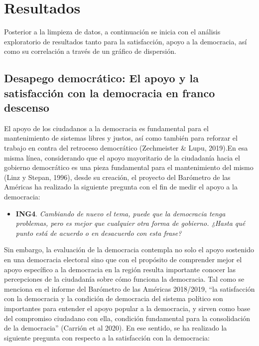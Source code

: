\documentclass[
]{book}
\providecommand{\tightlist}{%
  \setlength{\itemsep}{0pt}\setlength{\parskip}{0pt}}
\begin{document}
\hypertarget{resultados-3}{%
\section{Resultados}\label{resultados-3}}

Posterior a la limpieza de datos, a continuación se inicia con el análisis exploratorio de resultados tanto para la satisfacción, apoyo a la democracia, así como su correlación a través de un gráfico de dispersión.

\hypertarget{desapego-democruxe1tico-el-apoyo-y-la-satisfacciuxf3n-con-la-democracia-en-franco-descenso}{%
\subsection{Desapego democrático: El apoyo y la satisfacción con la democracia en franco descenso}\label{desapego-democruxe1tico-el-apoyo-y-la-satisfacciuxf3n-con-la-democracia-en-franco-descenso}}

El apoyo de los ciudadanos a la democracia es fundamental para el mantenimiento de sistemas libres y justos, así como también para reforzar el trabajo en contra del retroceso democrático (Zechmeister \& Lupu, 2019).En esa misma línea, considerando que el apoyo mayoritario de la ciudadanía hacia el gobierno democrático es una pieza fundamental para el mantenimiento del mismo (Linz y Stepan, 1996), desde su creación, el proyecto del Barómetro de las Américas ha realizado la siguiente pregunta con el fin de medir el apoyo a la democracia:

\begin{itemize}
\tightlist
\item
  \textbf{ING4}. \emph{Cambiando de nuevo el tema, puede que la democracia tenga problemas, pero es mejor que cualquier otra forma de gobierno. ¿Hasta qué punto está de acuerdo o en desacuerdo con esta frase?}
\end{itemize}

Sin embargo, la evaluación de la democracia contempla no solo el apoyo sostenido en una democracia electoral sino que con el propósito de comprender mejor el apoyo específico a la democracia en la región resulta importante conocer las percepciones de la ciudadanía sobre cómo funciona la democracia. Tal como se menciona en el informe del Barómetro de las Américas 2018/2019, ``la satisfacción con la democracia y la condición de democracia del sistema político son importantes para entender el apoyo popular a la democracia, y sirven como base del compromiso ciudadano con ella, condición fundamental para la consolidación de la democracia'' (Carrión et al 2020). En ese sentido, se ha realizado la siguiente pregunta con respecto a la satisfacción con la democracia:
\end{document}
